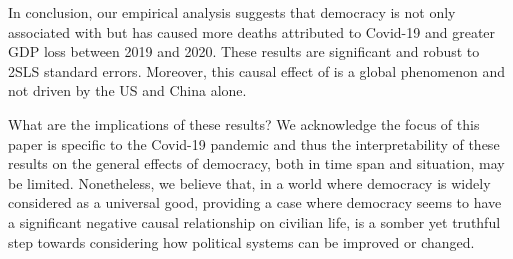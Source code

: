 In conclusion, our empirical analysis suggests that democracy is not only associated with but has caused more deaths attributed to Covid-19 and greater GDP loss between 2019 and 2020. These results are significant and robust to 2SLS standard errors. Moreover, this causal effect of is a global phenomenon and not driven by the US and China alone. 

What are the implications of these results? We acknowledge the focus of this paper is specific to the Covid-19 pandemic and thus the interpretability of these results on the general effects of democracy, both in time span and situation, may be limited. Nonetheless, we believe that, in a world where democracy is widely considered as a universal good, providing a case where democracy seems to have a significant negative causal relationship on civilian life, is a somber yet truthful step towards considering how political systems can be improved or changed. 


